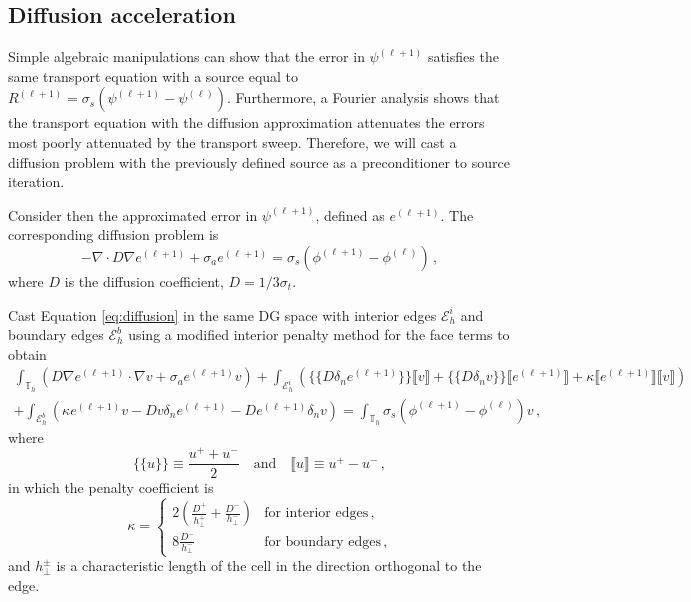 \documentclass{article}
\begin{document}
\subsection{Diffusion acceleration}

Simple algebraic manipulations can show that the error in $\psi^{(\ell + 1)}$ satisfies the same transport equation with a source equal to $R^{(\ell + 1)} = \sigma_s (\psi^{(\ell + 1)} - \psi^{(\ell)})$. Furthermore, a Fourier analysis shows that the transport equation with the diffusion approximation attenuates the errors most poorly attenuated by the transport sweep. Therefore, we will cast a diffusion problem with the previously defined source as a preconditioner to source iteration.
	
Consider then the approximated error in $\psi^{(\ell + 1)}$, defined as $e^{(\ell + 1)}$. The corresponding diffusion problem is
\begin{equation}
	\label{eq:diffusion}
	- \nabla \cdot D \nabla e^{(\ell + 1)} + \sigma_a e^{(\ell + 1)} = \sigma_s (\phi^{(\ell + 1)} - \phi^{(\ell)})\,,
\end{equation}
where $D$ is the diffusion coefficient, $D = 1 / 3 \sigma_t$.

Cast Equation \eqref{eq:diffusion} in the same DG space with interior edges $\mathcal{E}_h^i$ and boundary edges $\mathcal{E}_h^b$ using a modified interior penalty method for the face terms to obtain
\begin{multline}
	\int_{\mathbb{T}_h} (D \nabla e^{(\ell + 1)} \cdot \nabla v + \sigma_a e^{(\ell + 1)} v) + \int_{\mathcal{E}_h^i} \left( \{\!\!\{ D \delta_n e^{(\ell + 1)} \}\!\!\} \llbracket v \rrbracket + \{\!\!\{ D \delta_n v \}\!\!\} \llbracket e^{(\ell + 1)} \rrbracket + \kappa \llbracket e^{(\ell + 1)} \rrbracket \llbracket v \rrbracket \right) \\
	+ \int_{\mathcal{E}_h^b} \left( \kappa e^{(\ell + 1)} v - D v \delta_n e^{(\ell + 1)} - D e^{(\ell + 1)} \delta_n v \right) = \int_{\mathbb{T}_h} \sigma_s (\phi^{(\ell + 1)} - \phi^{(\ell)}) v\,,
\end{multline}
	where
\[
	\{\!\!\{ u \}\!\!\} \equiv \frac{u^+ + u^-}{2} \quad \text{and} \quad \llbracket u \rrbracket \equiv u^+ - u^-\,,
\]
in which the penalty coefficient is
\[
	\kappa = \begin{cases} 2 \left(\frac{D^+}{h^+_\bot} + \frac{D^-}{h^-_\bot}\right) & \text{for~interior~edges}\,, \\ 8 \frac{D^-}{h^-_\bot} & \text{for~boundary~edges}\,, \end{cases}
\]
and $h^\pm_\bot$ is a characteristic length of the cell in the direction orthogonal to the edge.
\end{document}
